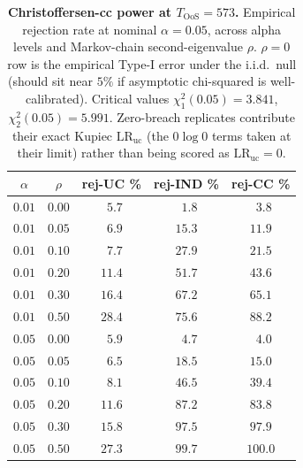 \begin{table}[!ht]
\centering
\small
\caption{\textbf{Christoffersen-cc power at $T_{\text{OoS}} = 573$.} Empirical rejection rate at nominal $\alpha = 0.05$, across alpha levels and Markov-chain second-eigenvalue $\rho$. $\rho = 0$ row is the empirical Type-I error under the i.i.d.\ null (should sit near $5\%$ if asymptotic chi-squared is well-calibrated). Critical values $\chi^2_1(0.05) = 3.841$, $\chi^2_2(0.05) = 5.991$. Zero-breach replicates contribute their exact Kupiec $\mathrm{LR}_{\text{uc}}$ (the $0\log 0$ terms taken at their limit) rather than being scored as $\mathrm{LR}_{\text{uc}} = 0$.}
\label{tab:christoffersen_power}
\begin{tabular}{c c c c c}
\toprule
$\alpha$ & $\rho$ & rej-UC \% & rej-IND \% & rej-CC \% \\
\midrule
$0.01$ & $0.00$ & $\phantom{0}5.7$ & $\phantom{0}1.8$ & $\phantom{0}3.8$ \\
$0.01$ & $0.05$ & $\phantom{0}6.9$ & $15.3$ & $11.9$ \\
$0.01$ & $0.10$ & $\phantom{0}7.7$ & $27.9$ & $21.5$ \\
$0.01$ & $0.20$ & $11.4$ & $51.7$ & $43.6$ \\
$0.01$ & $0.30$ & $16.4$ & $67.2$ & $65.1$ \\
$0.01$ & $0.50$ & $28.4$ & $75.6$ & $88.2$ \\
\midrule
$0.05$ & $0.00$ & $\phantom{0}5.9$ & $\phantom{0}4.7$ & $\phantom{0}4.0$ \\
$0.05$ & $0.05$ & $\phantom{0}6.5$ & $18.5$ & $15.0$ \\
$0.05$ & $0.10$ & $\phantom{0}8.1$ & $46.5$ & $39.4$ \\
$0.05$ & $0.20$ & $11.6$ & $87.2$ & $83.8$ \\
$0.05$ & $0.30$ & $15.8$ & $97.5$ & $97.9$ \\
$0.05$ & $0.50$ & $27.3$ & $99.7$ & $100.0$ \\
\bottomrule
\end{tabular}
\end{table}

